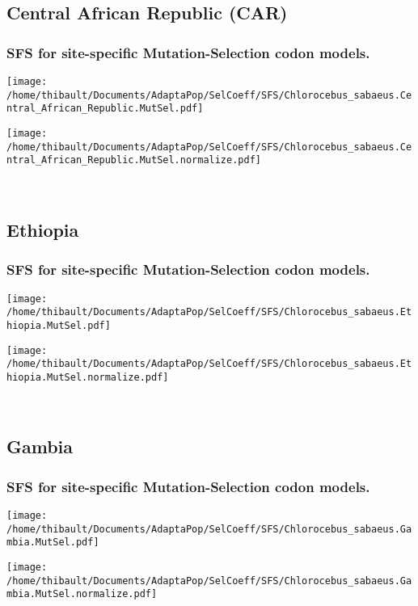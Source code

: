 \subsection{Central African Republic (CAR)} 
 
\subsubsection*{SFS for site-specific Mutation-Selection codon models.} 
\begin{minipage}{0.49\linewidth} 
\texttt{[image: /home/thibault/Documents/AdaptaPop/SelCoeff/SFS/Chlorocebus\_sabaeus.Central\_African\_Republic.MutSel.pdf]} 
\end{minipage}
\begin{minipage}{0.49\linewidth}
\texttt{[image: /home/thibault/Documents/AdaptaPop/SelCoeff/SFS/Chlorocebus\_sabaeus.Central\_African\_Republic.MutSel.normalize.pdf]} 
\end{minipage}
\\ 
\subsection{Ethiopia} 
 
\subsubsection*{SFS for site-specific Mutation-Selection codon models.} 
\begin{minipage}{0.49\linewidth} 
\texttt{[image: /home/thibault/Documents/AdaptaPop/SelCoeff/SFS/Chlorocebus\_sabaeus.Ethiopia.MutSel.pdf]} 
\end{minipage}
\begin{minipage}{0.49\linewidth}
\texttt{[image: /home/thibault/Documents/AdaptaPop/SelCoeff/SFS/Chlorocebus\_sabaeus.Ethiopia.MutSel.normalize.pdf]} 
\end{minipage}
\\ 
\subsection{Gambia} 
 
\subsubsection*{SFS for site-specific Mutation-Selection codon models.} 
\begin{minipage}{0.49\linewidth} 
\texttt{[image: /home/thibault/Documents/AdaptaPop/SelCoeff/SFS/Chlorocebus\_sabaeus.Gambia.MutSel.pdf]} 
\end{minipage}
\begin{minipage}{0.49\linewidth}
\texttt{[image: /home/thibault/Documents/AdaptaPop/SelCoeff/SFS/Chlorocebus\_sabaeus.Gambia.MutSel.normalize.pdf]} 
\end{minipage}
\\ 
